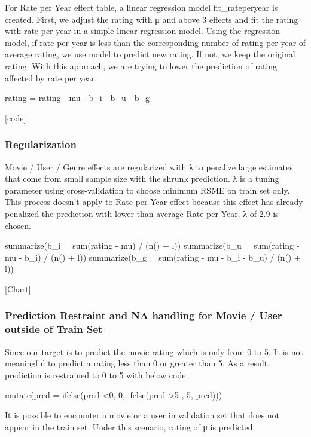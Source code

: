 \documentclass[
]{article}
\begin{document}
For Rate per Year effect table, a linear regression model
fit\_rateperyear is created. First, we adjust the rating with μ and
above 3 effects and fit the rating with rate per year in a simple linear
regression model. Using the regression model, if rate per year is less
than the corresponding number of rating per year of average rating, we
use model to predict new rating. If not, we keep the original rating.
With this approach, we are trying to lower the prediction of rating
affected by rate per year.

rating = rating - mu - b\_i - b\_u - b\_g

{[}code{]}

\hypertarget{regularization}{%
\subsubsection{Regularization}\label{regularization}}

Movie / User / Genre effects are regularized with λ to penalize large
estimates that come from small sample size with the shrunk prediction. λ
is a tuning parameter using cross-validation to choose minimum RSME on
train set only. This process doesn't apply to Rate per Year effect
because this effect has already penalized the prediction with
lower-than-average Rate per Year. λ of 2.9 is chosen.

summarize(b\_i = sum(rating - mu) / (n() + l)) summarize(b\_u =
sum(rating - mu - b\_i) / (n() + l)) summarize(b\_g = sum(rating - mu -
b\_i - b\_u) / (n() + l))

{[}Chart{]}

\hypertarget{prediction-restraint-and-na-handling-for-movie-user-outside-of-train-set}{%
\subsubsection{Prediction Restraint and NA handling for Movie / User
outside of Train
Set}\label{prediction-restraint-and-na-handling-for-movie-user-outside-of-train-set}}

Since our target is to predict the movie rating which is only from 0 to
5. It is not meaningful to predict a rating less than 0 or greater than
5. As a result, prediction is restrained to 0 to 5 with below code.

mutate(pred = ifelse(pred \textless0, 0, ifelse(pred \textgreater5 , 5,
pred)))

It is possible to encounter a movie or a user in validation set that
does not appear in the train set. Under this scenario, rating of μ is
predicted.
\end{document}
